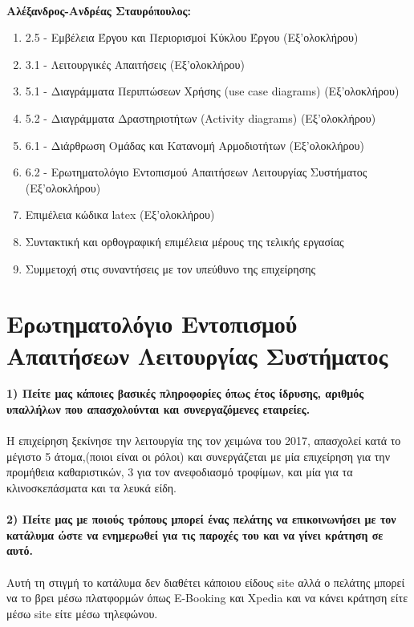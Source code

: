 \noindent
\\\textbf{Αλέξανδρος-Ανδρέας Σταυρόπουλος: }
\begin{enumerate}
	\item 2.5 - Εμβέλεια Έργου και Περιορισμοί Κύκλου Έργου (Εξ'ολοκλήρου)
	\item 3.1 - Λειτουργικές Απαιτήσεις (Εξ'ολοκλήρου)
	\item 5.1 - Διαγράμματα Περιπτώσεων Χρήσης (use case diagrams) (Εξ'ολοκλήρου)
	\item 5.2 - Διαγράμματα Δραστηριοτήτων (Activity diagrams) (Εξ'ολοκλήρου)
	\item 6.1 - Διάρθρωση Ομάδας και Κατανομή Αρμοδιοτήτων (Εξ'ολοκλήρου)
	\item 6.2 - Ερωτηματολόγιο Εντοπισμού Απαιτήσεων Λειτουργίας Συστήματος (Εξ'ολοκλήρου)
	\item Επιμέλεια κώδικα latex (Εξ'ολοκλήρου)
	\item Συντακτική και ορθογραφική επιμέλεια μέρους της τελικής εργασίας
	\item Συμμετοχή στις συναντήσεις με τον υπεύθυνο της επιχείρησης
\end{enumerate}


\section{Ερωτηματολόγιο Εντοπισμού Απαιτήσεων Λειτουργίας Συστήματος}
\textbf{1) Πείτε μας κάποιες βασικές πληροφορίες όπως έτος ίδρυσης, αριθμός 
	υπαλλήλων που απασχολούνται και συνεργαζόμενες εταιρείες.} \\ \\
\noindent
Η επιχείρηση ξεκίνησε την λειτουργία της τον χειμώνα του 2017, απασχολεί κατά 
το μέγιστο 5 άτομα,(ποιοι είναι οι ρόλοι) και συνεργάζεται με μία επιχείρηση
για την προμήθεια καθαριστικών, 3 για τον ανεφοδιασμό τροφίμων, και μία για 
τα κλινοσκεπάσματα και τα λευκά είδη. \\ \\

\noindent
\textbf{2) Πείτε μας με ποιούς τρόπους μπορεί ένας πελάτης να επικοινωνήσει
	με τον κατάλυμα ώστε να ενημερωθεί για τις παροχές του και να γίνει κράτηση
	σε αυτό.} \\ \\
\noindent
Αυτή τη στιγμή το κατάλυμα δεν διαθέτει κάποιου είδους site αλλά ο πελάτης
μπορεί να το βρει μέσω πλατφορμών όπως 	E-Booking και Xpedia και να κάνει
κράτηση είτε μέσω site είτε μέσω τηλεφώνου. \\ \\ 
  
